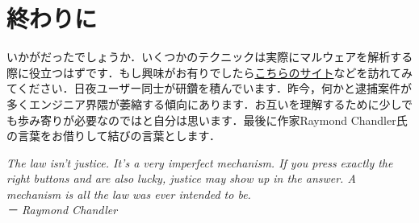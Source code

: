 \section{終わりに}
いかがだったでしょうか．いくつかのテクニックは実際にマルウェアを解析する際に役立つはずです．もし興味がお有りでしたら\href{https://crackmes.one/}{こちらのサイト}などを訪れてみてください．日夜ユーザー同士が研鑽を積んでいます．昨今，何かと逮捕案件が多くエンジニア界隈が萎縮する傾向にあります．お互いを理解するために少しでも歩み寄りが必要なのではと自分は思います．最後に作家Raymond Chandler氏の言葉をお借りして結びの言葉とします．



\textit{The law isn’t justice. It’s a very imperfect mechanism. If you press exactly the right buttons and are also lucky, justice may show up in the answer. A mechanism is all the law was ever intended to be.\\
－ Raymond Chandler}
